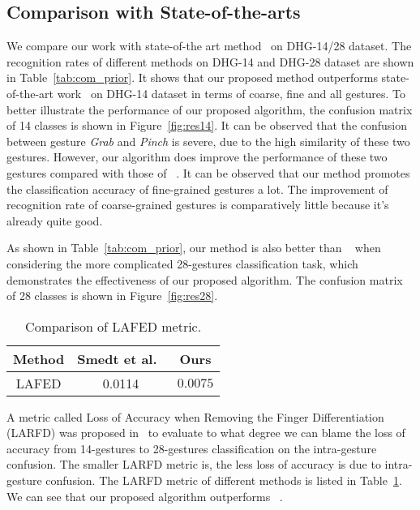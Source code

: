 \documentclass{article}
\begin{document}
\subsection{Comparison with State-of-the-arts}
\label{sssec:28gesture}

We compare our work with state-of-the art method~\cite{de2016skeleton} on DHG-14/28 dataset. The recognition rates of different methods on DHG-14 and DHG-28 dataset are shown in Table~\ref{tab:com_prior}. It shows that our proposed method outperforms state-of-the-art work~\cite{de2016skeleton} on DHG-14 dataset in terms of coarse, fine and all gestures. To better illustrate the performance of our proposed algorithm, the confusion matrix of 14 classes is shown in Figure~\ref{fig:res14}. It can be observed that the confusion between gesture {\it{Grab}} and {\it{Pinch}} is severe, due to the high similarity of these two gestures. However, our algorithm does improve the performance of these two gestures compared with those of ~\cite{de2016skeleton}. It can be observed that our method promotes the classification accuracy of fine-grained gestures a lot. The improvement of recognition rate of coarse-grained gestures is comparatively little because it's already quite good.

As shown in Table~\ref{tab:com_prior}, our method is also better than ~\cite{de2016skeleton} when considering the more complicated 28-gestures classification task, which demonstrates the effectiveness of our proposed algorithm.
The confusion matrix of 28 classes is shown in Figure~\ref{fig:res28}.
\begin{table}[!htb]
\centering
\caption{Comparison of LAFED metric.}
\vspace{0.1cm}
\label{tab:lafed}
\begin{tabular}{|c|c|c|}
\hline
Method & Smedt et al.~\cite{de2016skeleton} & Ours \\\hline
LAFED & 0.0114 & $\bm{0.0075}$ \\\hline
\end{tabular}
\end{table}
A metric called Loss of Accuracy when Removing the Finger Differentiation (LARFD) was proposed in~\cite{de2016skeleton} to evaluate to what degree we can blame the loss of accuracy from 14-gestures to 28-gestures classification on the intra-gesture confusion. The smaller LARFD metric is, the less loss of accuracy is due to intra-gesture confusion. The LARFD metric of different methods is listed in Table~\ref{tab:lafed}. We can see that our proposed algorithm outperforms ~\cite{de2016skeleton}.
\end{document}
